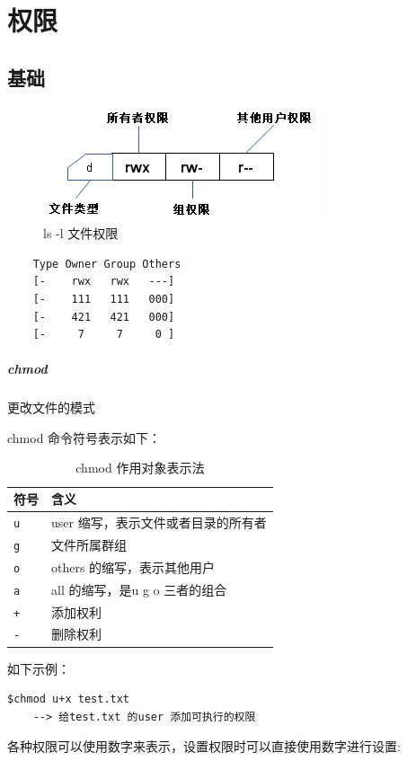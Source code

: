 \documentclass[UTF8,a4paper,12pt]{ctexbook}
\begin{document}
	\section{权限}
		\subsection{基础}
		\begin{figure}[h]
			\centering
			\includegraphics[scale = 1]{fileDescription.png}
			\caption{ls -l 文件权限}
		\end{figure}
		
		\begin{lstlisting}
	Type Owner Group Others
	[-    rwx   rwx   ---]
	[-    111   111   000]
	[-    421   421   000]
	[-     7     7     0 ]
		\end{lstlisting}
		 \subparagraph{chmod}更改文件的模式
		 
			 chmod 命令符号表示如下：
				\begin{table}[H]
					\centering
					\caption{chmod 作用对象表示法}
					\begin{tabular}{l|m{14cm}}
						\hline
						符号 	   	   & 含义\\
						\hline
						\verb|u |		& user 缩写，表示文件或者目录的所有者\\
						\verb|g	|		& 文件所属群组\\
						\verb|o	|		& others 的缩写，表示其他用户\\
						\verb|a	|		& all 的缩写，是u g o 三者的组合\\
						\verb|+ |		& 添加权利\\
						\verb|-	|		& 删除权利\\
						\hline
					\end{tabular}
				\end{table}	
			
			如下示例：	
			\begin{lstlisting}[frame=L,xleftmargin=.1\textwidth]
	$chmod u+x test.txt
	--> 给test.txt 的user 添加可执行的权限
			\end{lstlisting}
			
			各种权限可以使用数字来表示，设置权限时可以直接使用数字进行设置:
			
\end{document}
